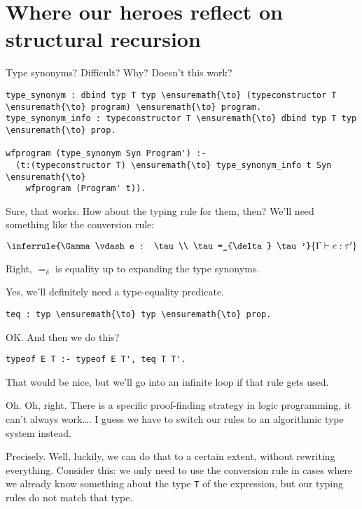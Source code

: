 \section{Where our heroes reflect on structural
recursion}\label{where-our-heroes-reflect-on-structural-recursion}

\heroSTUDENT{} Type synonyms? Difficult? Why? Doesn't this work?

\begin{verbatim}
type_synonym : dbind typ T typ \ensuremath{\to} (typeconstructor T \ensuremath{\to} program) \ensuremath{\to} program.
type_synonym_info : typeconstructor T \ensuremath{\to} dbind typ T typ \ensuremath{\to} prop.

wfprogram (type_synonym Syn Program') :-
  (t:(typeconstructor T) \ensuremath{\to} type_synonym_info t Syn \ensuremath{\to}
    wfprogram (Program' t)).
\end{verbatim}

\heroADVISOR{} Sure, that works. How about the typing rule for them, then?
We'll need something like the conversion rule:

\begin{center}$\inferrule{\Gamma \vdash e : \tau \\ \tau =_{\delta} \tau'}{\Gamma \vdash e : \tau'}$\end{center}

\heroSTUDENT{} Right, \(=_{\delta}\) is equality up to expanding the type
synonyms.

\heroADVISOR{} Yes, we'll definitely need a type-equality predicate.

\begin{verbatim}
teq : typ \ensuremath{\to} typ \ensuremath{\to} prop.
\end{verbatim}

\heroSTUDENT{} OK. And then we do this?

\begin{verbatim}
typeof E T :- typeof E T', teq T T'.
\end{verbatim}

\heroADVISOR{} That would be nice, but we'll go into an infinite loop if that
rule gets used.

\heroSTUDENT{} Oh. Oh, right. There is a specific proof-finding strategy in
logic programming, it can't always work\ldots{}. I guess we have to
switch our rules to an algorithmic type system instead.

\heroADVISOR{} Precisely. Well, luckily, we can do that to a certain extent,
without rewriting everything. Consider this: we only need to use the
conversion rule in cases where we already know something about the type
\texttt{T} of the expression, but our typing rules do not match that
type.

